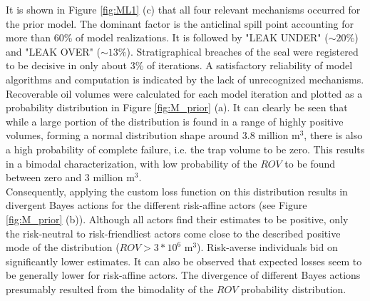 		It is shown in Figure \ref{fig:ML1} (c) that all four relevant mechanisms occurred for the prior model. The dominant factor is the anticlinal spill point accounting for more than 60\% of model realizations. It is followed by "LEAK UNDER" ($\sim20\%$) and "LEAK OVER" ($\sim13\%$). Stratigraphical breaches of the seal were registered to be decisive in only about 3\% of iterations. A satisfactory reliability of model algorithms and computation is indicated by the lack of unrecognized mechanisms.\\
		Recoverable oil volumes were calculated for each model iteration and plotted as a probability distribution in Figure \ref{fig:M_prior} (a). It can clearly be seen that while a large portion of the distribution is found in a range of highly positive volumes, forming a normal distribution shape around 3.8 million m$^3$, there is also a high probability of complete failure, i.e. the trap volume to be zero. This results in a bimodal characterization, with low probability of the $ROV$ to be found between zero and 3 million m$^3$.\\
		Consequently, applying the custom loss function on this distribution results in divergent Bayes actions for the different risk-affine actors (see Figure \ref{fig:M_prior} (b)). Although all actors find their estimates to be positive, only the risk-neutral to risk-friendliest actors come close to the described positive mode of the distribution ($ROV > 3*10^6$ m$^3$). Risk-averse individuals bid on significantly lower estimates. It can also be observed that expected losses seem to be generally lower for risk-affine actors. The divergence of different Bayes actions presumably resulted from the bimodality of the $ROV$ probability distribution.
		
